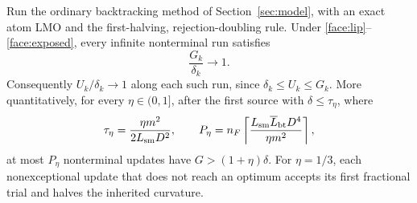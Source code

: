 \begin{theorem}
\label{face:ratio}
Run the ordinary backtracking method of Section~\ref{sec:model}, with an
exact atom LMO and the first-halving, rejection-doubling rule. Under
\eqref{face:lip}--\eqref{face:exposed}, every infinite nonterminal run
satisfies
\begin{equation}\label{face:ratiolimit}
 \frac{G_k}{\delta_k}\longrightarrow 1.
\end{equation}
Consequently $U_k/\delta_k\to1$ along each such run, since
$\delta_k\le U_k\le G_k$.
More quantitatively, for every $\eta\in(0,1]$, after the first source
with $\delta\le\tau_\eta$, where
\begin{equation}\label{face:threshold}
 \tau_\eta=\frac{\eta m^2}{2L_{\rm sm}D^2},\qquad
 P_\eta=n_F\left\lceil\frac{L_{\rm sm}\overline L_{\rm bt}D^4}
                              {\eta m^2}\right\rceil,
\end{equation}
at most $P_\eta$ nonterminal updates have
$G>(1+\eta)\delta$. For $\eta=1/3$, each nonexceptional update that does not reach an
optimum accepts its first fractional trial and halves the inherited
curvature.
\end{theorem}
